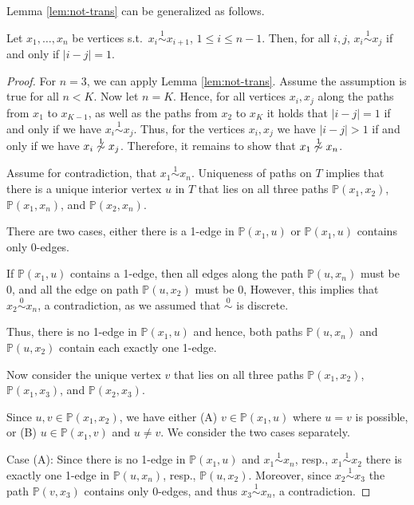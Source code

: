 \documentclass[smallextended]{svjour3}
\newcommand{\Ro}{\mathrel{\overset{0}{\sim}}}
\newcommand{\Rl}{\mathrel{\overset{1}{\sim}}}
\begin{document}
Lemma \ref{lem:not-trans} can be generalized as follows.
\begin{lemma}
  Let $x_1,\dots,x_n$ be vertices s.t.\ $x_{i}\Rl x_{i+1}$, $1\leq i\leq
  n-1$.  Then, for all $i,j$, $x_i\Rl x_j$ if and only if $|i-j|=1$.
  \label{lem:cycle-free}
\end{lemma}
\begin{proof}
  For $n=3$, we can apply Lemma \ref{lem:not-trans}. Assume the assumption
  is true for all $n<K$. Now let $n=K$. Hence, for all vertices $x_i,x_j$
  along the paths from $x_1$ to $x_{K-1}$, as well as the paths from $x_2$
  to $x_K$ it holds that $|i-j|=1$ if and only if we have $x_i\Rl
  x_j$. Thus, for the vertices $x_i,x_j$ we have $|i-j|>1$ if and only if
  we have $x_i\not \Rl x_j$. Therefore, it remains to show that $x_1\not\Rl
  x_n$.
	
  Assume for contradiction, that $x_1\Rl x_n$.  Uniqueness of paths on $T$
  implies that there is a unique interior vertex $u$ in $T$ that lies on
  all three paths $\mathbb{P}(x_1,x_2)$, $\mathbb{P}(x_1,x_n)$, and
  $\mathbb{P}(x_2,x_n)$.

  There are two cases, either there is a 1-edge in $\mathbb{P}(x_1,u)$ or
  $\mathbb{P}(x_1,u)$ contains only 0-edges.

  If $\mathbb{P}(x_1,u)$ contains a 1-edge, then all edges along the path
  $\mathbb{P}(u, x_n)$ must be $0$, and all the edge on path $\mathbb{P}(u,
  x_2)$ must be $0$, However, this implies that $x_2\Ro x_n$, a
  contradiction, as we assumed that $\Ro$ is discrete.

  Thus, there is no 1-edge in $\mathbb{P}(x_1,u)$ and hence, both paths
  $\mathbb{P}(u,x_n)$ and $\mathbb{P}(u,x_2)$ contain each exactly one
  1-edge.
		
  Now consider the unique vertex $v$ that lies on all three paths
  $\mathbb{P}(x_1,x_2)$, $\mathbb{P}(x_1,x_3)$, and $\mathbb{P}(x_2,x_3)$.

  Since $u,v\in \mathbb{P}(x_1,x_2)$, we have either (A) $v\in
  \mathbb{P}(x_1,u)$ where $u=v$ is possible, or (B) $u\in
  \mathbb{P}(x_1,v)$ and $u\neq v$. We consider the two cases separately.

  \smallskip Case (A): Since there is no 1-edge in $\mathbb{P}(x_1,u)$ and
  $x_1\Rl x_n$, resp., $x_1\Rl x_2$ there is exactly one 1-edge in
  $\mathbb{P}(u,x_n)$, resp., $\mathbb{P}(u,x_2)$.  Moreover, since $x_2\Rl
  x_3$ the path $\mathbb{P}(v,x_3)$ contains only 0-edges, and thus $x_3\Rl
  x_n$, a contradiction.


\end{proof}
\end{document}
